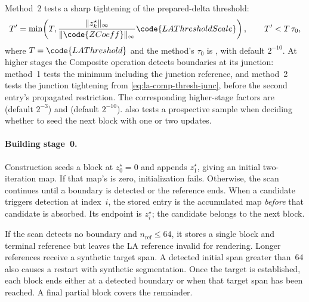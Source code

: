 Method~2 tests a sharp tightening of the prepared-delta threshold:
\begin{equation}
T'=\min\!\left(T,
  \frac{\lVert z_k^\star\rVert_\infty}
       {\lVert\code{ZCoeff}\rVert_\infty}
  \code{LAThresholdScale}\right),\qquad
T'<T\,\tau_0,
\label{eq:period-detect-coeff}
\end{equation}
where $T=\code{LAThreshold}$ and the method's $\tau_0$ is
, with default $2^{-10}$.
At higher stages the Composite operation detects boundaries at its
junction: method~1 tests the minimum including the junction reference,
and method~2 tests the junction tightening from
\cref{eq:la-comp-thresh-junc}, before the second entry's propagated
restriction. The corresponding higher-stage factors are
 (default $2^{-3}$) and
 (default $2^{-10}$).
 also tests a prospective sample when deciding
whether to seed the next block with one or two updates.

\paragraph{Building stage~0.}
Construction seeds a block at $z_0^\star=0$ and appends $z_1^\star$,
giving an initial two-iteration map. If that map's  is
zero, initialization fails. Otherwise, the scan continues until a
boundary is detected or the reference ends. When a candidate triggers
detection at index~$i$, the stored entry is the accumulated map
\emph{before} that candidate is absorbed. Its endpoint is $z_i^\star$;
the candidate belongs to the next block.

If the scan detects no boundary and $n_{\mathrm{ref}}\le64$, it stores
a single block and terminal reference but leaves the LA reference
invalid for rendering. Longer references receive a synthetic target
span. A detected initial span greater than~64 also causes a restart
with synthetic segmentation. Once the target is established, each
block ends either at a detected boundary or when that target span has
been reached. A final partial block covers the remainder.

